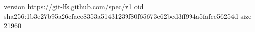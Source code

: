 version https://git-lfs.github.com/spec/v1
oid sha256:1b3e27b95a26cfaee8353a51431239f80f65673e62bed3ff994a5fafce56254d
size 21960
